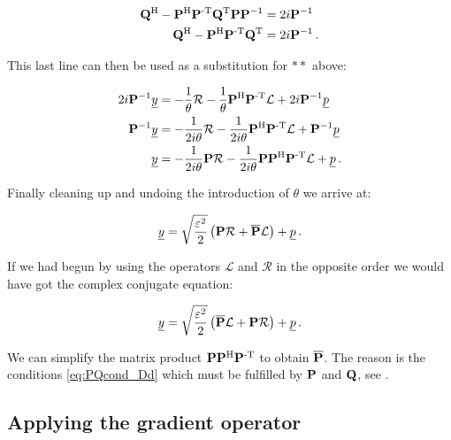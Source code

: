 \begin{align*}
  \mathbf{Q}{}^{\textnormal{H}} - \mathbf{P}{}^{\textnormal{H}} \mathbf{P}{}^{\textnormal{-T}} \mathbf{Q}{}^{\textnormal{T}} \mathbf{P} \mathbf{P}{}^{-1} & = 2i \mathbf{P}{}^{-1} \\
  \mathbf{Q}{}^{\textnormal{H}} - \mathbf{P}{}^{\textnormal{H}} \mathbf{P}{}^{\textnormal{-T}} \mathbf{Q}{}^{\textnormal{T}} & = 2i \mathbf{P}{}^{-1} \,.
\end{align*}

This last line can then be used as a substitution for $**$ above:

\begin{align*}
  2i \mathbf{P}{}^{-1} \underline{y} & = -\frac{1}{\theta} \mathcal{R}
                             -\frac{1}{\theta} \mathbf{P}{}^{\textnormal{H}}\mathbf{P}{}^{\textnormal{-T}}\mathcal{L}
                             +2i \mathbf{P}{}^{-1} \underline{p} \\
  \mathbf{P}{}^{-1} \underline{y} & = -\frac{1}{2i\theta} \mathcal{R}
                          -\frac{1}{2i\theta} \mathbf{P}{}^{\textnormal{H}} \mathbf{P}{}^{\textnormal{-T}} \mathcal{L}
                          +\mathbf{P}{}^{-1} \underline{p} \\
  \underline{y} & = -\frac{1}{2i\theta} \mathbf{P}\mathcal{R}
                          -\frac{1}{2i\theta} \mathbf{P} \mathbf{P}{}^{\textnormal{H}} \mathbf{P}{}^{\textnormal{-T}} \mathcal{L}
                          +\underline{p} \,.
\end{align*}

Finally cleaning up and undoing the introduction of $\theta$ we arrive at:

\begin{equation}
  \underline{y} = \sqrt{\frac{\varepsilon^2}{2}} \left( \mathbf{P}\mathcal{R} + \mathbf{\overline{P}} \mathcal{L} \right) + \underline{p} \,.
\end{equation}

If we had begun by using the operators $\mathcal{L}$ and $\mathcal{R}$ in the opposite order
we would have got the complex conjugate equation:

\begin{equation}
  \underline{y} = \sqrt{\frac{\varepsilon^2}{2}} \left( \overline{\mathbf{P}}\mathcal{L} + \mathbf{P} \mathcal{R} \right) + \underline{p} \,.
\end{equation}

We can simplify the matrix product $\mathbf{P} \mathbf{P}{}^{\textnormal{H}} \mathbf{P}{}^{\textnormal{-T}}$ to obtain $\mathbf{\overline{P}}$.
The reason is the conditions \eqref{eq:PQcond_Dd} which must be fulfilled by
$\mathbf{P}$ and $\mathbf{Q}$, see \cite{H_ladder_operators}.


\subsection{Applying the gradient operator}


